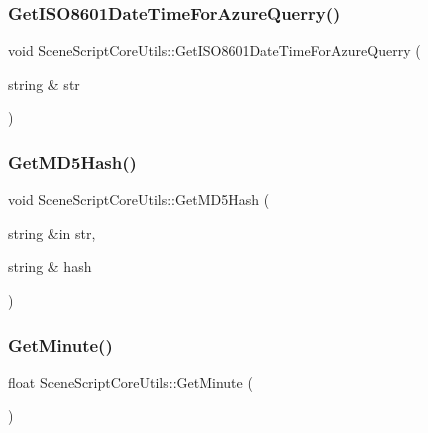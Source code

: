 \hypertarget{class_scene_script_core_utils_a6fce3dbb278a56415f73d8cad625092a}{}\label{class_scene_script_core_utils_a6fce3dbb278a56415f73d8cad625092a} 
\subsubsection{\texorpdfstring{Get\+I\+S\+O8601\+Date\+Time\+For\+Azure\+Querry()}{GetISO8601DateTimeForAzureQuerry()}}
{\footnotesize\ttfamily void Scene\+Script\+Core\+Utils\+::\+Get\+I\+S\+O8601\+Date\+Time\+For\+Azure\+Querry (\begin{DoxyParamCaption}\item[{string \&}]{str }\end{DoxyParamCaption})}

\hypertarget{class_scene_script_core_utils_a0f701e398ad5a9c5e85d842fee541894}{}\label{class_scene_script_core_utils_a0f701e398ad5a9c5e85d842fee541894} 
\subsubsection{\texorpdfstring{Get\+M\+D5\+Hash()}{GetMD5Hash()}}
{\footnotesize\ttfamily void Scene\+Script\+Core\+Utils\+::\+Get\+M\+D5\+Hash (\begin{DoxyParamCaption}\item[{string \&in}]{str,  }\item[{string \&}]{hash }\end{DoxyParamCaption})}

\hypertarget{class_scene_script_core_utils_a51257caacd09badefecbeeafb4fbfbb1}{}\label{class_scene_script_core_utils_a51257caacd09badefecbeeafb4fbfbb1} 
\subsubsection{\texorpdfstring{Get\+Minute()}{GetMinute()}}
{\footnotesize\ttfamily float Scene\+Script\+Core\+Utils\+::\+Get\+Minute (\begin{DoxyParamCaption}{ }\end{DoxyParamCaption})}

